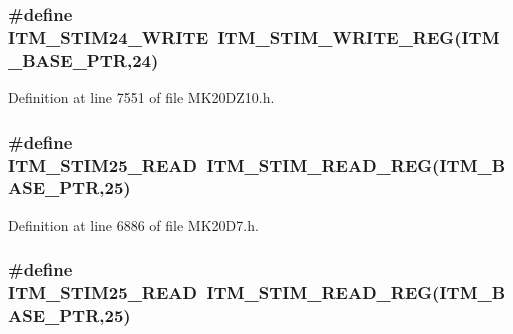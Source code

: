 \subsubsection[{\texorpdfstring{I\+T\+M\+\_\+\+S\+T\+I\+M24\+\_\+\+W\+R\+I\+TE}{ITM_STIM24_WRITE}}]{\setlength{\rightskip}{0pt plus 5cm}\#define I\+T\+M\+\_\+\+S\+T\+I\+M24\+\_\+\+W\+R\+I\+TE~{\bf I\+T\+M\+\_\+\+S\+T\+I\+M\+\_\+\+W\+R\+I\+T\+E\+\_\+\+R\+EG}({\bf I\+T\+M\+\_\+\+B\+A\+S\+E\+\_\+\+P\+TR},24)}\hypertarget{group___i_t_m___register___accessor___macros_gaba2149ea4a29fd70514c8e637a6cedd9}{}\label{group___i_t_m___register___accessor___macros_gaba2149ea4a29fd70514c8e637a6cedd9}


Definition at line 7551 of file M\+K20\+D\+Z10.\+h.

\subsubsection[{\texorpdfstring{I\+T\+M\+\_\+\+S\+T\+I\+M25\+\_\+\+R\+E\+AD}{ITM_STIM25_READ}}]{\setlength{\rightskip}{0pt plus 5cm}\#define I\+T\+M\+\_\+\+S\+T\+I\+M25\+\_\+\+R\+E\+AD~{\bf I\+T\+M\+\_\+\+S\+T\+I\+M\+\_\+\+R\+E\+A\+D\+\_\+\+R\+EG}({\bf I\+T\+M\+\_\+\+B\+A\+S\+E\+\_\+\+P\+TR},25)}\hypertarget{group___i_t_m___register___accessor___macros_ga5e80b2d49c4833d6faa2843b39cc71e0}{}\label{group___i_t_m___register___accessor___macros_ga5e80b2d49c4833d6faa2843b39cc71e0}


Definition at line 6886 of file M\+K20\+D7.\+h.

\subsubsection[{\texorpdfstring{I\+T\+M\+\_\+\+S\+T\+I\+M25\+\_\+\+R\+E\+AD}{ITM_STIM25_READ}}]{\setlength{\rightskip}{0pt plus 5cm}\#define I\+T\+M\+\_\+\+S\+T\+I\+M25\+\_\+\+R\+E\+AD~{\bf I\+T\+M\+\_\+\+S\+T\+I\+M\+\_\+\+R\+E\+A\+D\+\_\+\+R\+EG}({\bf I\+T\+M\+\_\+\+B\+A\+S\+E\+\_\+\+P\+TR},25)}\hypertarget{group___i_t_m___register___accessor___macros_ga5e80b2d49c4833d6faa2843b39cc71e0}{}\label{group___i_t_m___register___accessor___macros_ga5e80b2d49c4833d6faa2843b39cc71e0}


